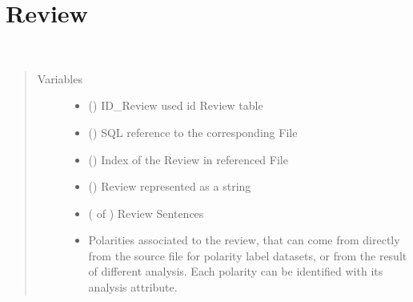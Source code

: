 \documentclass[letterpaper,10pt,english]{sphinxmanual}
\begin{document}
\section{Review}
\label{\detokenize{classes:review}}

\begin{fulllineitems}
\label{\detokenize{classes:loacore.classes.classes.Review}}~\begin{quote}\begin{description}
\item[{Variables}] \leavevmode\begin{itemize}
\item {} 
 () \textendash{} ID\_Review used id Review table

\item {} 
 () \textendash{} SQL reference to the corresponding File

\item {} 
 () \textendash{} Index of the Review in referenced File

\item {} 
 () \textendash{} Review represented as a string

\item {} 
 ( of {\hyperref[\detokenize{classes:loacore.classes.classes.Sentence}]{}}) \textendash{} Review Sentences

\item {} 
 \textendash{} Polarities associated to the review, that can come from directly from the source file for polarity label
datasets, or from the result of different analysis. Each polarity can be identified with its analysis attribute.

\end{itemize}


\end{description}
\end{quote}
\end{fulllineitems}
\end{document}
